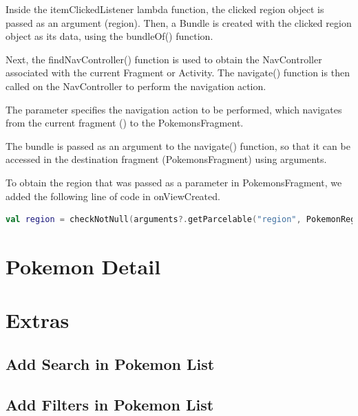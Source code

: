 \documentclass[a4paper, 12pt]{article}
\begin{document}
Inside the itemClickedListener lambda function, the clicked region object is passed as an argument (region). 
Then, a Bundle is created with the clicked region object as its data, using the bundleOf() function.

Next, the findNavController() function is used to obtain the NavController associated with the current Fragment or Activity. 
The navigate() function is then called on the NavController to perform the navigation action.

The \textit{\texttt{}} parameter specifies the navigation action to be performed, 
which navigates from the current fragment (\textit{\texttt{}}) to the PokemonsFragment.

The bundle is passed as an argument to the navigate() function, so that it can be accessed in the destination fragment (PokemonsFragment) using arguments.

To obtain the region that was passed as a parameter in PokemonsFragment, we added the following line of code in onViewCreated.

\begin{lstlisting}[caption={Pokemons Fragment to suport navigation code.}, label={code:code_pokemons_fragment_nav}, language=Kotlin]
    val region = checkNotNull(arguments?.getParcelable("region", PokemonRegion::class.java))

\end{lstlisting}


\section{Pokemon Detail}

\section{Extras}

\subsection{Add Search in Pokemon List}


\subsection{Add Filters in Pokemon List}


\end{document}
